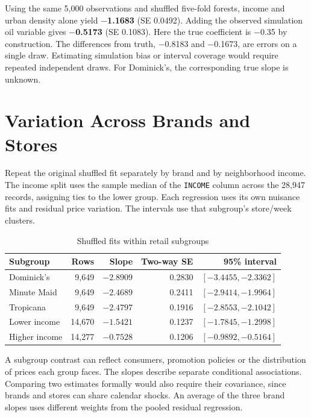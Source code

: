 Using the same 5,000 observations and shuffled five-fold forests, income and urban density alone yield \textbf{\ensuremath{-}1.1683} (SE 0.0492). Adding the observed simulation oil variable gives \textbf{\ensuremath{-}0.5173} (SE 0.1083). Here the true coefficient is \ensuremath{-}0.35 by construction. The differences from truth, \ensuremath{-}0.8183 and \ensuremath{-}0.1673, are errors on a single draw. Estimating simulation bias or interval coverage would require repeated independent draws. For Dominick's, the corresponding true slope is unknown.

\section{Variation Across Brands and Stores}\label{sec:heterogeneous_sensitivity}

Repeat the original shuffled fit separately by brand and by neighborhood income. The income split uses the sample median of the \texttt{INCOME} column across the 28,947 records, assigning ties to the lower group. Each regression uses its own nuisance fits and residual price variation. The intervals use that subgroup's store/week clusters.

\begin{table}[htbp]
\centering
\caption{Shuffled fits within retail subgroups}
\label{tab:brand_sensitivity}
\small
\setlength{\tabcolsep}{3pt}
\begin{tabular}{@{}lrrrr@{}}
\toprule
Subgroup & Rows & Slope & Two-way SE & 95\% interval \\
\midrule
Dominick's & 9,649 & $-2.8909$ & 0.2830 & $[-3.4455, -2.3362]$ \\
Minute Maid & 9,649 & $-2.4689$ & 0.2411 & $[-2.9414, -1.9964]$ \\
Tropicana & 9,649 & $-2.4797$ & 0.1916 & $[-2.8553, -2.1042]$ \\
Lower income & 14,670 & $-1.5421$ & 0.1237 & $[-1.7845, -1.2998]$ \\
Higher income & 14,277 & $-0.7528$ & 0.1206 & $[-0.9892, -0.5164]$ \\
\bottomrule
\end{tabular}
\end{table}

A subgroup contrast can reflect consumers, promotion policies or the distribution of prices each group faces. The slopes describe separate conditional associations. Comparing two estimates formally would also require their covariance, since brands and stores can share calendar shocks. An average of the three brand slopes uses different weights from the pooled residual regression.

